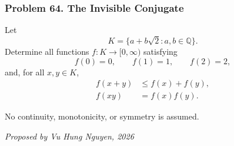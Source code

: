 \subsubsection*{Problem 64. The Invisible Conjugate}

\begin{exercisebox}[hard]

Let
\[
K=\{a+b\sqrt2:a,b\in\mathbb Q\}.
\]
Determine all functions $f:K\to[0,\infty)$ satisfying
\[
f(0)=0,\qquad f(1)=1,\qquad f(2)=2,
\]
and, for all $x,y\in K$,
\[
\boxed{
\begin{aligned}
f(x+y)&\le f(x)+f(y),\\
f(xy)&=f(x)f(y).
\end{aligned}}
\]

No continuity, monotonicity, or symmetry is assumed.

\begin{flushright}
\textit{Proposed by Vu Hung Nguyen, 2026}
\end{flushright}


\end{exercisebox}
